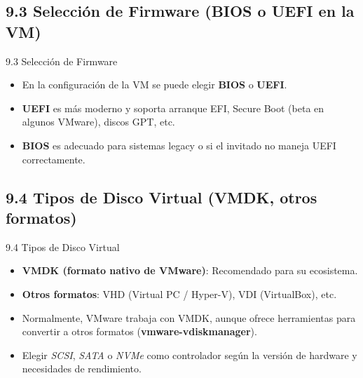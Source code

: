 \documentclass{beamer}
\begin{document}
\subsection{9.3 Selección de Firmware (BIOS o UEFI en la VM)}
\begin{frame}{9.3 Selección de Firmware}
    \begin{itemize}
        \item En la configuración de la VM se puede elegir \textbf{BIOS} o \textbf{UEFI}.
        \item \textbf{UEFI} es más moderno y soporta arranque EFI, Secure Boot (beta en algunos VMware), discos GPT, etc.
        \item \textbf{BIOS} es adecuado para sistemas legacy o si el invitado no maneja UEFI correctamente.
    \end{itemize}
\end{frame}

\subsection{9.4 Tipos de Disco Virtual (VMDK, otros formatos)}
\begin{frame}{9.4 Tipos de Disco Virtual}
    \begin{itemize}
        \item \textbf{VMDK (formato nativo de VMware)}: Recomendado para su ecosistema.
        \item \textbf{Otros formatos}: VHD (Virtual PC / Hyper-V), VDI (VirtualBox), etc.
        \item Normalmente, VMware trabaja con VMDK, aunque ofrece herramientas para convertir a otros formatos (\textbf{vmware-vdiskmanager}).
        \item Elegir \textit{SCSI}, \textit{SATA} o \textit{NVMe} como controlador según la versión de hardware y necesidades de rendimiento.
    \end{itemize}
\end{frame}

\end{document}
